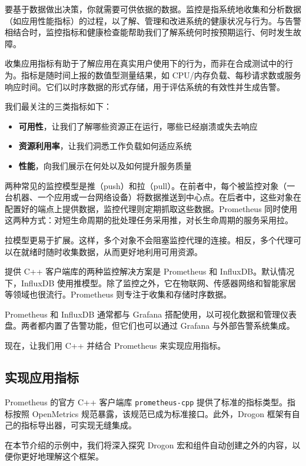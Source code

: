 \label{idx:1898}
要基于数据做出决策，你就需要可供依据的数据。监控是指系统地收集和分析数据（如应用性能指标）的过程，以了解、管理和改进系统的健康状况与行为。与告警相结合时，监控指标和健康检查能帮助我们了解系统何时按预期运行、何时发生故障。

收集应用指标有助于了解应用在真实用户使用下的行为，而非在合成测试中的行为。指标是随时间上报的数值型测量结果，如 CPU/内存负载、每秒请求数或服务响应时间。它们以时序数据的形式存储，用于评估系统的有效性并生成告警。

我们最关注的三类指标如下：

\begin{itemize}
\item \textbf{可用性}，让我们了解哪些资源正在运行，哪些已经崩溃或失去响应
\item \textbf{资源利用率}，让我们洞悉工作负载如何适应系统
\item \textbf{性能}，向我们展示在何处以及如何提升服务质量
\end{itemize}

\label{idx:1899}
两种常见的监控模型是推（push）和拉（pull）。在前者中，每个被监控对象（一台机器、一个应用或一台网络设备）将数据推送到中心点。在后者中，这些对象在配置好的端点上提供数据，监控代理则定期抓取这些数据。Prometheus 同时使用这两种方式：对短生命周期的批处理任务采用推，对长生命周期的服务采用拉。

拉模型更易于扩展。这样，多个对象不会阻塞监控代理的连接。相反，多个代理可以在就绪时随时收集数据，从而更好地利用可用资源。

提供 C++ 客户端库的两种监控解决方案是 Prometheus 和 InfluxDB。默认情况下，InfluxDB 使用推模型。除了监控之外，它在物联网、传感器网络和智能家居等领域也很流行。Prometheus 则专注于收集和存储时序数据。

Prometheus 和 InfluxDB 通常都与 Grafana 搭配使用，以可视化数据和管理仪表盘。两者都内置了告警功能，但它们也可以通过 Grafana 与外部告警系统集成。

现在，让我们用 C++ 并结合 Prometheus 来实现应用指标。

\subsection{实现应用指标}

\label{idx:1900}
Prometheus 的官方 C++ 客户端库 \texttt{prometheus-cpp} 提供了标准的指标类型。指标按照 OpenMetrics 规范暴露，该规范已成为标准接口。此外，Drogon 框架有自己的指标导出器，可实现无缝集成。

在本节介绍的示例中，我们将深入探究 Drogon 宏和组件自动创建之外的内容，以便你更好地理解这个框架。

